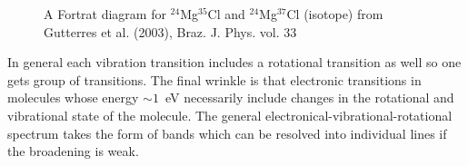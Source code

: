 {\begin{figure}
\centering
{}
\caption{A Fortrat diagram for $^{24}$Mg$^{35}$Cl and
  $^{24}$Mg$^{37}$Cl (isotope) from Gutterres et al. (2003),
  Braz. J. Phys. vol. 33}
\label{fig:fortrat}
\end{figure}}

In general each vibration transition includes a rotational transition
as well so one gets group of transitions.  The final wrinkle is that
electronic transitions in molecules whose energy $\sim 1$~eV
necessarily include changes in the rotational and vibrational state of
the molecule.  The general electronical-vibrational-rotational
spectrum takes the form of bands which can be resolved into individual
lines if the broadening is weak.

